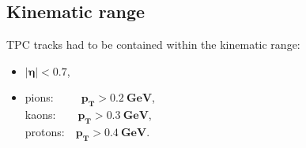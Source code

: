 \subsection{Kinematic range}\label{sec:TpcKinematicCuts}
TPC tracks had to be contained within the kinematic range:
\begin{itemize}
\item \textbf{$\bm{|\eta|<0.7}$},
\item pions:~~~~~\textbf{$\bm{p_{T}>0.2~\textrm{GeV}}$},\\kaons:~~~~\hspace{1.6pt}\textbf{$\bm{p_{T}>0.3~\textrm{GeV}}$},\\protons:~~\textbf{$\bm{p_{T}>0.4~\textrm{GeV}}$}.
\end{itemize}